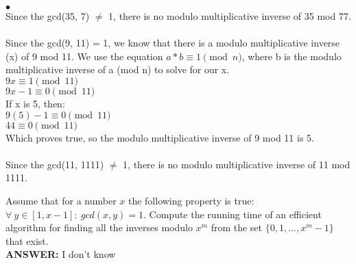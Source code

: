 \documentclass{article}
\newenvironment{myitem}{\begin{list}{$\bullet$}
{\setlength{\itemsep}{-0pt}
\setlength{\topsep}{0pt}
\setlength{\labelwidth}{0pt}
\setlength{\leftmargin}{10pt}
\setlength{\parsep}{-0pt}
\setlength{\itemsep}{0pt}
\setlength{\partopsep}{0pt}}}%
{\end{list}}
\begin{document}
\begin{myitem}
 \\
Since the gcd(35, 7) $\neq$ 1, there is no modulo multiplicative inverse of 35 mod 77.\\

 \\
Since the gcd(9, 11) = 1, we know that there is a modulo multiplicative inverse
(x) of 9 mod 11. We use the equation $a*b \equiv 1 \pmod{n}$, where b is the
modulo multiplicative inverse of a (mod n) to solve for our x.\\
$9x \equiv 1 \pmod{11}$\\
$9x - 1  \equiv 0 \pmod{11}$\\
If x is 5, then:\\
$9(5)-1 \equiv 0 \pmod{11}$\\
$44 \equiv 0 \pmod{11}$\\
Which proves true, so the modulo multiplicative inverse of 9 mod 11 is 5.\\

\\ 
Since the gcd(11, 1111) $\neq$ 1, there is no modulo multiplicative inverse of 11 mod 1111.\\


\item Assume that for a number $x$ the following property is true:
  $\forall\ y \in [1,x-1]:\ gcd(x,y) = 1$. Compute the running time of
  an efficient algorithm for finding all the inverses modulo $x^m$
  from the set $\{0, 1, \ldots, x^m-1\}$ that exist.\\

{\bfseries ANSWER: } I don't know\\
\end{myitem}
\end{document}
